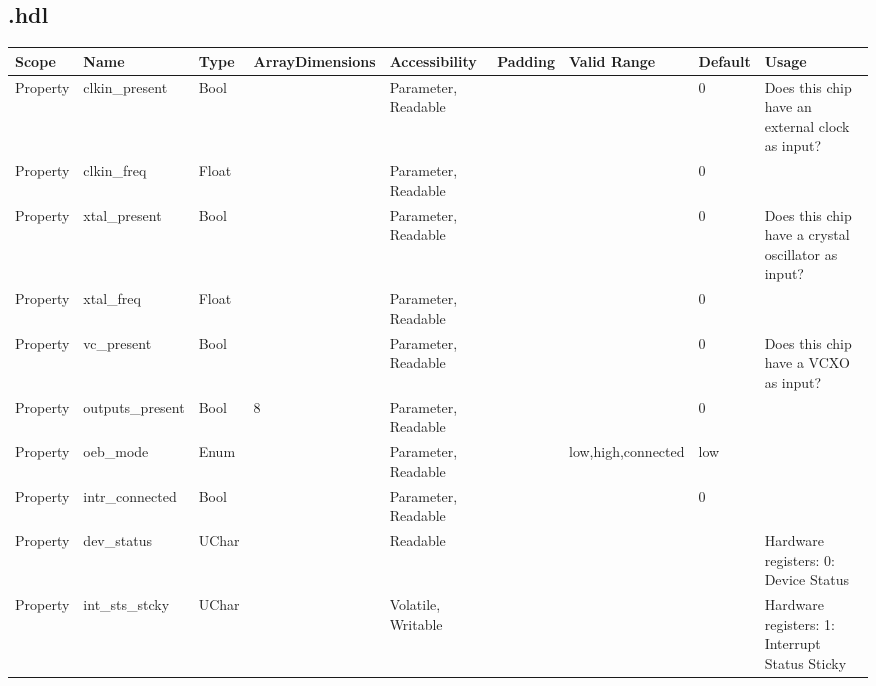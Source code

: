 \begin{landscape}
	\subsection*{\comp.hdl}
	\begin{scriptsize}
		\begin{longtable}[l]{|p{2cm}|p{2cm}|p{1cm}|p{2cm}|p{1.7cm}|p{1cm}|p{2.5cm}|p{1cm}|p{5.88cm}|}
			\hline
			\rowcolor{blue}
			Scope        & Name                 & Type  &ArrayDimensions& Accessibility & Padding & Valid Range  & Default & Usage \\
			\hline
			Property     & clkin\_present       & Bool  &                 & Parameter, Readable &   &              & 0       & Does this chip have an external clock as input? \\
			\hline
			Property     & clkin\_freq          & Float &                 & Parameter, Readable &   &              & 0       &       \\
			\hline
			Property     & xtal\_present        & Bool  &                 & Parameter, Readable &   &              & 0       & Does this chip have a crystal oscillator as input? \\
			\hline
			Property     & xtal\_freq           & Float &                 & Parameter, Readable &   &              & 0       &       \\
			\hline
			Property     & vc\_present          & Bool  &                 & Parameter, Readable &   &              & 0       & Does this chip have a VCXO as input? \\
			\hline
			Property     & outputs\_present     & Bool  & 8               & Parameter, Readable &   &              & 0       &       \\
			\hline
			Property     & oeb\_mode            & Enum  &                 & Parameter, Readable &   & low,high,connected&low &       \\
			\hline
			Property     & intr\_connected      & Bool  &                 & Parameter, Readable &   &              & 0       &       \\
			\hline
      Property     & dev\_status          & UChar &                 & Readable            &   &              &         & Hardware registers: 0: Device Status \\
			\hline
      Property     & int\_sts\_stcky      & UChar &                 & Volatile, Writable  &   &              &         & Hardware registers: 1: Interrupt Status Sticky \\

\end{longtable}
\end{scriptsize}
\end{landscape}
